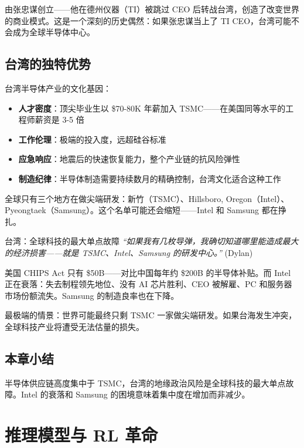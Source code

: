 \documentclass[a4paper]{article}
\begin{document}
由张忠谋创立——他在德州仪器（TI）被跳过 CEO 后转战台湾，创造了改变世界的商业模式。这是一个深刻的历史偶然：如果张忠谋当上了 TI CEO，台湾可能不会成为全球半导体中心。

\subsection{台湾的独特优势}

台湾半导体产业的文化基因：

\begin{itemize}
    \item \textbf{人才密度}：顶尖毕业生以 \$70-80K 年薪加入 TSMC——在美国同等水平的工程师薪资是 3-5 倍
    \item \textbf{工作伦理}：极端的投入度，远超硅谷标准
    \item \textbf{应急响应}：地震后的快速恢复能力，整个产业链的抗风险弹性
    \item \textbf{制造纪律}：半导体制造需要持续数月的精确控制，台湾文化适合这种工作
\end{itemize}

全球只有三个地方在做尖端研发：新竹（TSMC）、Hillsboro, Oregon（Intel）、Pyeongtaek（Samsung）。这个名单可能还会缩短——Intel 和 Samsung 都在挣扎。

\begin{warningbox}{台湾：全球科技的最大单点故障}
\textit{``如果我有几枚导弹，我确切知道哪里能造成最大的经济损害——就是 TSMC、Intel、Samsung 的研发中心。''} (Dylan)

美国 CHIPS Act 只有 \$50B——对比中国每年约 \$200B 的半导体补贴。而 Intel 正在衰落：失去制程领先地位、没有 AI 芯片胜利、CEO 被解雇、PC 和服务器市场份额流失。Samsung 的制造良率也在下降。

最极端的情景：世界可能最终只剩 TSMC 一家做尖端研发。如果台海发生冲突，全球科技产业将遭受无法估量的损失。
\end{warningbox}

\subsection{本章小结}

半导体供应链高度集中于 TSMC，台湾的地缘政治风险是全球科技的最大单点故障。Intel 的衰落和 Samsung 的困境意味着集中度在增加而非减少。

\section{推理模型与 RL 革命}
\end{document}

